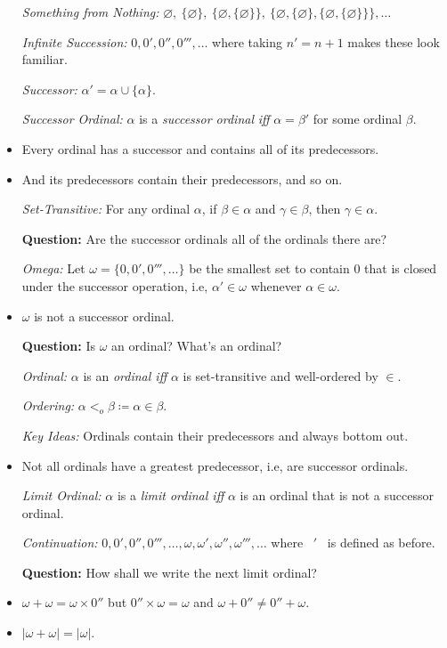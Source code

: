 \documentclass[a4paper, 11pt]{article} %
\newcommand{\set}[1]{\lbrace#1\rbrace} %
\newcommand{\abs}[1]{|#1|} %
\begin{document}
\begin{itemize}
  \item[\it Something from Nothing:] $\varnothing,\ \set{\varnothing},\ \set{\varnothing,\set{\varnothing}},\ \set{\varnothing,\set{\varnothing},\set{\varnothing,\set{\varnothing}}},\ldots$
  \item[\it Infinite Succession:] $0, 0', 0'', 0''',\ldots$ where taking $n' = n + 1$ makes these look familiar.
  \item[\it Successor:] $\alpha' = \alpha \cup \set{\alpha}$.
  \item[\it Successor Ordinal:] $\alpha$ is a \textit{successor ordinal} \textit{iff} $\alpha = \beta'$ for some ordinal $\beta$. 
  \item Every ordinal has a successor and contains all of its predecessors.
  \item And its predecessors contain their predecessors, and so on.
  \item[\it Set-Transitive:] For any ordinal $\alpha$, if $\beta\in\alpha$ and $\gamma\in\beta$, then $\gamma\in\alpha$.
  \item[\bf Question:] Are the successor ordinals all of the ordinals there are?
  \item[\it Omega:] Let $\omega = \set{0, 0', 0''',\ldots}$ be the smallest set to contain $0$ that is closed under the successor operation, i.e, $\alpha'\in \omega$ whenever $\alpha\in \omega$. 
  \item $\omega$ is not a successor ordinal. 
  \item[\bf Question:] Is $\omega$ an ordinal? What's an ordinal?
  \item[\it Ordinal:] $\alpha$ is an \textit{ordinal iff} $\alpha$ is set-transitive and well-ordered by $\in$. 
  \item[\it Ordering:] $\alpha <_o \beta \coloneq \alpha \in \beta$.
  \item[\it Key Ideas:] Ordinals contain their predecessors and always bottom out.
  \item Not all ordinals have a greatest predecessor, i.e, are successor ordinals.
  \item[\it Limit Ordinal:] $\alpha$ is a \textit{limit ordinal iff} $\alpha$ is an ordinal that is not a successor ordinal. 
  \item[\it Continuation:] $0,0',0'',0''',\ldots,\omega, \omega', \omega'', \omega''',\ldots$ where~ $'$~ is defined as before.
  \item[\bf Question:] How shall we write the next limit ordinal?
  \item $\omega+\omega=\omega\times 0''$ but $0''\times\omega=\omega$ and $\omega + 0''\neq 0'' + \omega$.
  \item $\abs{\omega+\omega} = \abs{\omega}$.
\end{itemize}
\end{document}
